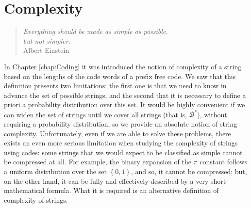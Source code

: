 %
%


%


\chapter{Complexity}
\label{chap:Algorithmic_Information}

\begin{quote}
\begin{flushright}
\emph{Everything should be made as simple as possible, \\
but not simpler. \\}
Albert Einstein
\end{flushright}
\end{quote}
\bigskip

In Chapter \ref{chap:Coding} it was introduced the notion of complexity of a string based on the lengths of the code words of a prefix free code. We saw that this definition presents two limitations: the first one is that we need to know in advance the set of possible strings, and the second that it is necessary to define a priori a probability distribution over this set. It would be highly convenient if we can widen the set of strings until we cover all strings (that is, $\mathcal{B}^\ast$), without requiring a probability distribution, so we provide an absolute notion of string complexity. Unfortunately, even if we are able to solve these problems, there exists an even more serious limitation when studying the complexity of strings using codes: some strings that we would expect to be classified as simple cannot be compressed at all. For example, the binary expansion of the $\pi$ constant follows a uniform distribution over the set $\left\{0, 1\right\}$, and so, it cannot be compressed; but, on the other hand, it can be fully and effectively described by a very short mathematical formula. What it is required is an alternative definition of complexity of strings.

